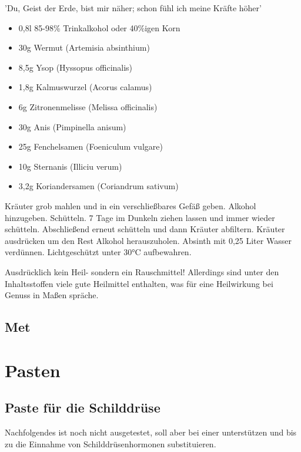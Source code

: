 
'Du, Geist der Erde, bist mir näher; schon fühl ich meine Kräfte höher'

\begin{itemize}
	\item 0,8l 85-98\% Trinkalkohol oder 40\%igen Korn
	\item 30g Wermut (Artemisia absinthium)
	\item 8,5g Ysop (Hyssopus officinalis)
	\item 1,8g Kalmuswurzel (Acorus calamus)
	\item 6g Zitronenmelisse (Melissa officinalis)
	\item 30g Anis (Pimpinella anisum)
	\item 25g Fenchelsamen (Foeniculum vulgare)
	\item 10g Sternanis (Illiciu verum)
	\item 3,2g Koriandersamen (Coriandrum sativum)
\end{itemize}

Kräuter grob mahlen und in ein verschließbares Gefäß geben.
Alkohol hinzugeben.
Schütteln.
7 Tage im Dunkeln ziehen lassen und immer wieder schütteln.
Abschließend erneut schütteln und dann Kräuter abfiltern.
Kräuter ausdrücken um den Rest Alkohol herauszuholen.
Absinth mit 0,25 Liter Wasser verdünnen.
Lichtgeschützt unter 30°C aufbewahren.


Ausdrücklich kein Heil- sondern ein Rauschmittel! Allerdings sind unter den Inhaltsstoffen viele gute Heilmittel enthalten, was für eine Heilwirkung bei Genuss in Maßen spräche.


\subsection{Met}




\newpage




\section{Pasten}

\subsection{Paste für die Schilddrüse}
 
 
Nachfolgendes ist noch nicht ausgetestet, soll aber bei einer  unterstützen und bis zu die Einnahme von Schilddrüsenhormonen substituieren.

